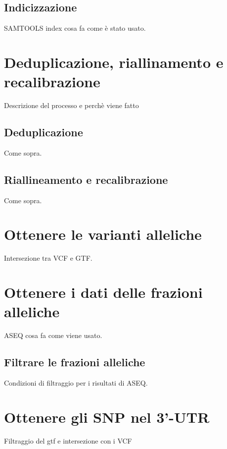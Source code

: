     \subsection{Indicizzazione}
    \label{subsec:indexing}
    SAMTOOLS index cosa fa come \`e stato usato.

  \section{Deduplicazione, riallinamento e recalibrazione}
  \label{sec:recalibration}
  Descrizione del processo e perch\`e viene fatto

    \subsection{Deduplicazione}
    \label{subsec:dedup}
    Come sopra.

    \subsection{Riallineamento e recalibrazione}
    \label{subsec:recalibration}
    Come sopra.

  \section{Ottenere le varianti alleliche}
  Intersezione tra VCF e GTF.

  \section{Ottenere i dati delle frazioni alleliche}
  \label{sec:aseq}
  ASEQ cosa fa come viene usato.


    \subsection{Filtrare le frazioni alleliche}
    \label{subsec:filter}
    Condizioni di filtraggio per i risultati di ASEQ.

  \section{Ottenere gli SNP nel 3'-UTR}
  \label{sec:threeprime}
  Filtraggio del gtf e intersezione con i VCF
